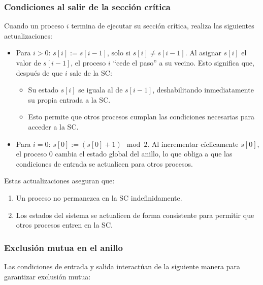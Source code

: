 \documentclass[a4paper,12pt]{article}
\begin{document}
\subsubsection{Condiciones al salir de la sección crítica}

Cuando un proceso $i$ termina de ejecutar su sección crítica, realiza las siguientes actualizaciones:

\begin{itemize}
    \item Para $i > 0$: $s[i] := s[i-1]$, solo si $s[i] \neq s[i-1]$.  
    Al asignar $s[i]$ el valor de $s[i-1]$, el proceso $i$ ``cede el paso'' a su vecino. Esto significa que, después de que $i$ sale de la SC:
    \begin{itemize}
        \item Su estado $s[i]$ se iguala al de $s[i-1]$, deshabilitando inmediatamente su propia entrada a la SC.
        \item Esto permite que otros procesos cumplan las condiciones necesarias para acceder a la SC.
    \end{itemize}

    \item Para $i = 0$: $s[0] := (s[0] + 1) \mod 2$.  
    Al incrementar cíclicamente $s[0]$, el proceso $0$ cambia el estado global del anillo, lo que obliga a que las condiciones de entrada se actualicen para otros procesos.
\end{itemize}

Estas actualizaciones aseguran que:
\begin{enumerate}
    \item Un proceso no permanezca en la SC indefinidamente.
    \item Los estados del sistema se actualicen de forma consistente para permitir que otros procesos entren en la SC.
\end{enumerate}

\subsubsection{Exclusión mutua en el anillo}

Las condiciones de entrada y salida interactúan de la siguiente manera para garantizar exclusión mutua:
\end{document}
